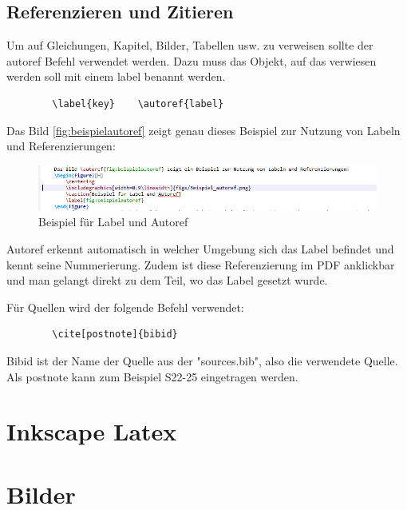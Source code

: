 	\subsection{Referenzieren und Zitieren}
	Um auf Gleichungen, Kapitel, Bilder, Tabellen usw. zu verweisen sollte der autoref Befehl verwendet werden. Dazu muss das Objekt, auf das verwiesen werden soll mit einem label benannt werden.
	\begin{verbatim}
		\label{key}    \autoref{label}
	\end{verbatim}
	Das Bild \autoref{fig:beispielautoref} zeigt genau dieses Beispiel zur Nutzung von Labeln und Referenzierungen:
	\begin{figure}[H]
		\centering
		\includegraphics[width=1.0\linewidth]{figs/Beispiel_autoref.png}
		\caption{Beispiel für Label und Autoref}
		\label{fig:beispielautoref}
	\end{figure}
	Autoref erkennt automatisch in welcher Umgebung sich das Label befindet und kennt seine Nummerierung. Zudem ist diese Referenzierung im PDF anklickbar und man gelangt direkt zu dem Teil, wo das Label gesetzt wurde.\newline\newline
	
	Für Quellen wird der folgende Befehl verwendet:
	\begin{verbatim}
		\cite[postnote]{bibid}
	\end{verbatim}
	Bibid ist der Name der Quelle aus der "sources.bib", also die verwendete Quelle.\newline
	Als postnote kann zum Beispiel S22-25 eingetragen werden.
	
	
	
	\newpage
	\section{Inkscape Latex}
	
	
	
	
	\newpage
	\section{Bilder}
